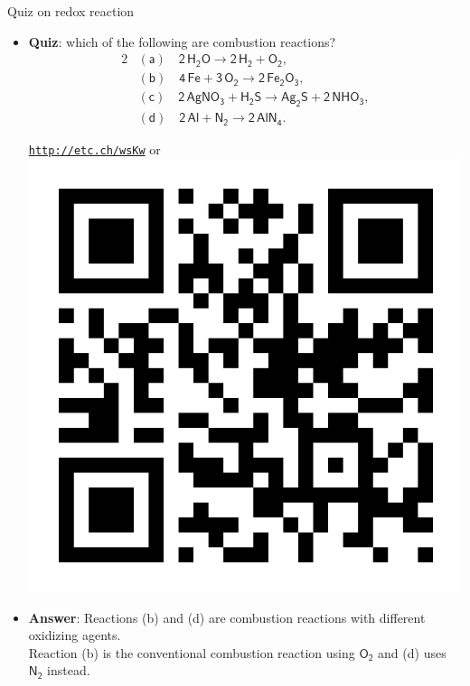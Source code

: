 \begin{frame}{Quiz on redox reaction}
	\begin{itemize}
		\item \alert{\textbf{Quiz}}:  which of the following are combustion reactions?\\[-20pt]
		\begin{alignat*}{2}
			& \mathsf{(a) \quad 2\,H_2O \rightarrow 2\,H_2+O_2,} \\[-3pt]
			& \mathsf{(b) \quad 4\,Fe+3\,O_2 \rightarrow 2\,Fe_2O_3, }\\[-3pt]
			& \mathsf{(c) \quad  2\,AgNO_3+H_2S \rightarrow Ag_2S+2\,NHO_3, }\\[-3pt]
			& \mathsf{(d) \quad  2\,Al+N_2 \rightarrow 2\,AlN_4.}
		\end{alignat*}
    	 \vskip -40pt
		\begin{center}
			\href{http://etc.ch/wsKw}{\textcolor{indigo(dye)}{\tt http://etc.ch/wsKw}} \quad or \quad
			\includegraphics[height=0.17\columnwidth]{figures/chemical-kinetics/polls.png}
		\end{center}
		\hiddenpause
		\item {\textbf{Answer}}: Reactions (b) and (d) are combustion reactions with different oxidizing agents. \\
		Reaction  (b) is the conventional combustion reaction using  $\mathsf{O_2}$  and (d) uses  $\mathsf{N_2}$  instead.
		
	\end{itemize}
	
\end{frame}
